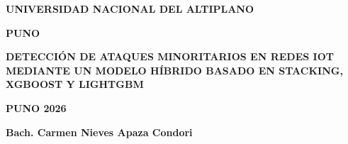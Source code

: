 
\newpage
\thispagestyle{empty}
\begin{center}
    \MakeUppercase{\fontsize{14pt}{1pt}\selectfont\textbf{Universidad Nacional del Altiplano}}
\end{center}

\begin{center}
    \MakeUppercase{\fontsize{12pt}{1pt}\selectfont\textbf{Puno}}
\end{center}

\begin{center}
    \MakeUppercase{\fontsize{12pt}{1pt}\selectfont{Facultad de Ingeniería Mecánica Eléctrica, Electrónica y Sistemas}}
\end{center}

\begin{center}
    \MakeUppercase{\fontsize{12pt}{1pt}\selectfont{Escuela Profesional de Ingeniería de Sistemas}}
\end{center}

\begin{center}
    \fontsize{11pt}{1.5pt}\selectfont{TESIS}
\end{center}

\begin{center}
    \MakeUppercase{\fontsize{12pt}{1.5pt}\selectfont\textbf{DETECCIÓN DE ATAQUES MINORITARIOS EN REDES IoT MEDIANTE UN MODELO HÍBRIDO BASADO EN STACKING, XGBOOST Y LIGHTGBM}}
\end{center}

\begin{center}
    \MakeUppercase{\fontsize{12pt}{1.5pt}\selectfont\textbf{PUNO 2026}}
\end{center}

\begin{center}
    \fontsize{12pt}{1pt}\selectfont{Presentado por:}
\end{center}

\begin{center}
    \fontsize{12pt}{1pt}\selectfont\textbf{Bach. Carmen Nieves Apaza Condori}
\end{center}

\begin{center}
    \fontsize{12pt}{1pt}\selectfont{Para optar el título profesional de:}
\end{center}


